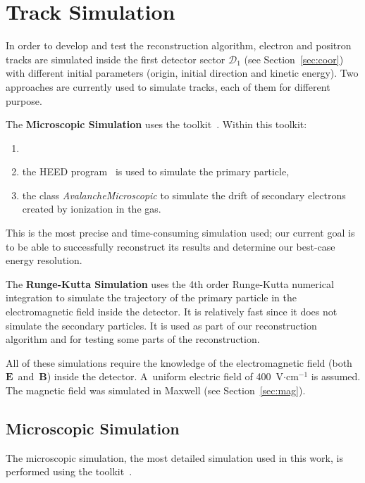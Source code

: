 \chapter{Track Simulation}
	In order to develop and test the reconstruction algorithm, electron and positron tracks are simulated inside the first detector sector $\mathcal{D}_1$ (see Section~\ref{sec:coor}) with different initial parameters (origin, initial direction and kinetic energy). Two approaches are currently used to simulate tracks, each of them for different purpose.
	
	The \textbf{Microscopic Simulation} uses the \garfieldpp toolkit~\cite{Garfield++}. Within this toolkit:
		\begin{enumerate}[nosep,label=\alph*)]
			\item {}
			\item the \ac{HEED} program~\cite{HEED} is used to simulate the primary particle,
			\item the class \textit{AvalancheMicroscopic} to simulate the drift of secondary electrons created by ionization in the gas.
		\end{enumerate}
	This is the most precise and time-consuming simulation used; our current goal is to be able to successfully reconstruct its results and determine our best-case energy resolution.
	
	The \textbf{Runge-Kutta Simulation} uses the 4th order Runge-Kutta numerical integration to simulate the trajectory of the primary particle in the electromagnetic field inside the detector. It is relatively fast since it does not simulate the secondary particles. It is used as part of our reconstruction algorithm and for testing some parts of the reconstruction.
	
	All of these simulations require the knowledge of the electromagnetic field (both $\mathbf{E}$~and~$\mathbf{B}$) inside the detector. A~uniform electric field of 400~V$\cdot$cm$^{-1}$ is assumed. The magnetic field was simulated in Maxwell (see Section~\ref{sec:mag}).
	
	
	\section{Microscopic Simulation}
	\label{sec:microsim}
		The microscopic simulation, the most detailed simulation used in this work, is performed using the \garfieldpp toolkit~\cite{Garfield++}.
		
